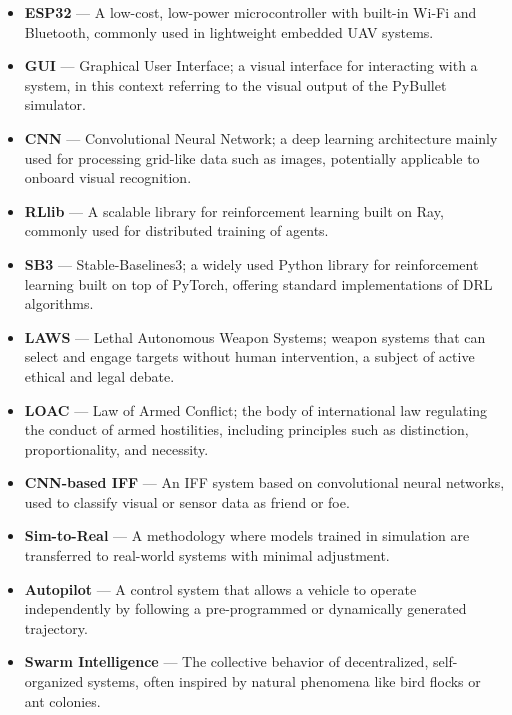 \begin{itemize}
            \item \textbf{ESP32} — A low-cost, low-power microcontroller with built-in Wi-Fi and Bluetooth, commonly used in lightweight embedded UAV systems.

            \item \textbf{GUI} — Graphical User Interface; a visual interface for interacting with a system, in this context referring to the visual output of the PyBullet simulator.

            \item \textbf{CNN} — Convolutional Neural Network; a deep learning architecture mainly used for processing grid-like data such as images, potentially applicable to onboard visual recognition.

            \item \textbf{RLlib} — A scalable library for reinforcement learning built on Ray, commonly used for distributed training of agents.

            \item \textbf{SB3} — Stable-Baselines3; a widely used Python library for reinforcement learning built on top of PyTorch, offering standard implementations of DRL algorithms.

            \item \textbf{LAWS} — Lethal Autonomous Weapon Systems; weapon systems that can select and engage targets without human intervention, a subject of active ethical and legal debate.

            \item \textbf{LOAC} — Law of Armed Conflict; the body of international law regulating the conduct of armed hostilities, including principles such as distinction, proportionality, and necessity.

            \item \textbf{CNN-based IFF} — An IFF system based on convolutional neural networks, used to classify visual or sensor data as friend or foe.

            \item \textbf{Sim-to-Real} — A methodology where models trained in simulation are transferred to real-world systems with minimal adjustment.

            \item \textbf{Autopilot} — A control system that allows a vehicle to operate independently by following a pre-programmed or dynamically generated trajectory.

            \item \textbf{Swarm Intelligence} — The collective behavior of decentralized, self-organized systems, often inspired by natural phenomena like bird flocks or ant colonies.


\end{itemize}
